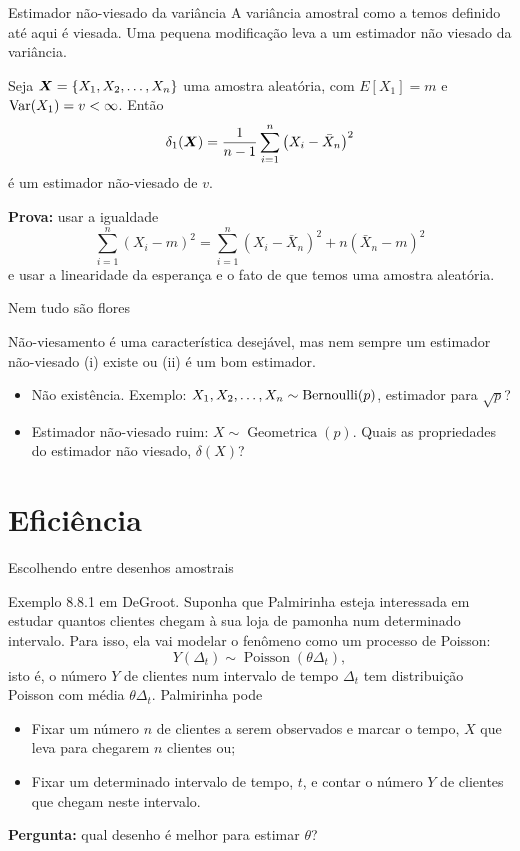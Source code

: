 \begin{frame}{Estimador não-viesado da variância}
A variância amostral como a temos definido até aqui é viesada. 
Uma pequena modificação leva a um estimador não viesado da variância.
\begin{theo}
\label{thm:variance_estimator}
 Seja $\boldsymbol{X} = \{ X_1, X_2, \ldots, X_n \}$ uma amostra aleatória, com $E[X_1] = m$ e $\operatorname{Var}(X_1) = v < \infty$.
 Então
 \begin{equation*}
  \delta_1(\boldsymbol{X}) = \frac{1}{n-1} \sum_{i=1}^n \left(X_i - \bar{X}_n \right)^2
 \end{equation*}
é um estimador não-viesado de $v$.
\end{theo}
\textbf{Prova:} usar a igualdade
$$ \sum_{i=1}^n \left(X_i - m \right)^2 = \sum_{i=1}^n \left(X_i - \bar{X}_n \right)^2 + n\left(\bar{X}_n - m \right)^2$$
e usar a linearidade da esperança e o fato de que temos uma amostra aleatória.
\end{frame}

\begin{frame}{Nem tudo são flores}

Não-viesamento é uma característica desejável, mas nem sempre um estimador não-viesado (i) existe ou (ii) é um bom estimador.

\begin{itemize}
 \item Não existência.
 Exemplo: $X_1, X_2, \ldots, X_n \sim \operatorname{Bernoulli}(p)$, estimador para $\sqrt{p}$?
 
 \item Estimador não-viesado ruim: $X\sim \operatorname{Geometrica}(p)$.
 Quais as propriedades do estimador não viesado, $\delta(X)$?
\end{itemize}
\end{frame}


\section{Eficiência}

\begin{frame}{Escolhendo entre desenhos amostrais}
\begin{exemplo}
\label{ex:choosing_exp_designs}
 Exemplo 8.8.1 em DeGroot.
 Suponha que Palmirinha esteja interessada em estudar quantos clientes chegam à sua loja de pamonha num  determinado intervalo.
 Para isso, ela vai modelar o fenômeno como um processo de Poisson:
 $$ Y(\Delta_t) \sim\operatorname{Poisson}(\theta\Delta_t),$$
 isto é, o número $Y$ de clientes num intervalo de tempo $\Delta_t$ tem distribuição Poisson com média $\theta\Delta_t$.
 Palmirinha pode
 \begin{itemize}
  \item Fixar um número $n$ de clientes a serem observados e marcar o tempo, $X$ que leva para chegarem $n$ clientes ou;
  \item Fixar um determinado intervalo de tempo, $t$, e contar o número $Y$ de clientes que chegam neste intervalo.
 \end{itemize}
\textbf{Pergunta:} qual desenho é melhor para estimar $\theta$?
\end{exemplo}
\end{frame}


